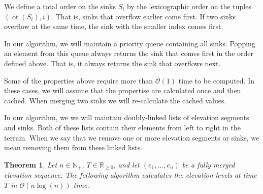 \documentclass[11pt,a4paper]{article}
\newtheorem{thm}{Theorem}
\newcommand{\Np}{\mathbb{N}_+}
\newcommand{\bO}{\mathcal{O}}
\newcommand{\Rnn}{\mathbb{R}_{\ge0}}
\DeclareMathOperator{\ot}{ot}
\begin{document}
We define a total order on the sinks $S_i$ by the lexicographic order on the tuples $(\ot(S_i), i)$.
That is, sinks that overflow earlier come first.
If two sinks overflow at the same time, the sink with the smaller index comes first.

In our algorithm, we will maintain a priority queue containing all sinks.
Popping an element from this queue always returns the sink that comes first in the order defined above.
That is, it always returns the sink that overflows next.

Some of the properties above require more than $\bO(1)$ time to be computed.
In these cases, we will assume that the propertise are calculated once and then cached.
When merging two sinks we will re-calculate the cached values.

In our algorithm, we we will maintain doubly-linked lists of elevation segments and sinks.
Both of these lists contain their elements from left to right in the terrain.
When we say that we remove one or more elevation segments or sinks, we mean removing them from these linked lists.

\begin{thm}
    Let $n\in\Np$, $T\in\Rnn$, and let $(e_1,\ldots,e_n)$ be a fully merged elevation sequence.
    The following algorithm calculates the elevation levels at time $T$ in $\bO(n\log(n))$ time.
\end{thm}

\vspace{1em}
\end{document}
